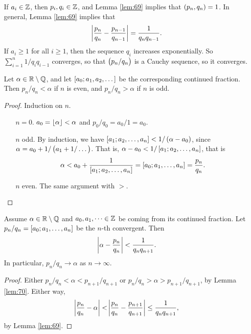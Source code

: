 \begin{note*}
If $ a_i \in \mathbb{Z} $, then $ p_i, q_i \in \mathbb{Z} $, and Lemma \ref{lem:69} implies that $ \br{p_n, q_n} = 1 $. In general, Lemma \ref{lem:69} implies that
$$ \abs{\dfrac{p_n}{q_n} - \dfrac{p_{n - 1}}{q_{n - 1}}} = \dfrac{1}{q_nq_{n - 1}}. $$
If $ a_i \ge 1 $ for all $ i \ge 1 $, then the sequence $ q_i $ increases exponentially. So $ \sum_{i = 1}^n 1 / q_iq_{i - 1} $ converges, so that $ \br{p_n / q_n} $ is a Cauchy sequence, so it converges.
\end{note*}

\pagebreak


\begin{lemma}
\label{lem:70}
Let $ \alpha \in \mathbb{R} \setminus \mathbb{Q} $, and let $ \sbr{a_0; a_1, a_2, \dots} $ be the corresponding continued fraction. Then $ p_n / q_n < \alpha $ if $ n $ is even, and $ p_n / q_n > \alpha $ if $ n $ is odd.
\end{lemma}

\begin{proof}
Induction on $ n $.
\begin{itemize}[leftmargin=0.5in]
\item[$ n = 0 $.] $ a_0 = \left\lfloor \alpha \right\rfloor < \alpha $ and $ p_0 / q_0 = a_0 / 1 = a_0 $.
\item[$ n $ odd.] By induction, we have $ \sbr{a_1; a_2, \dots, a_n} < 1 / \br{\alpha - a_0} $, since $ \alpha = a_0 + 1 / \br{a_1 + 1 / \dots} $. That is, $ \alpha - a_0 < 1 / \sbr{a_1; a_2, \dots, a_n} $, that is
$$ \alpha < a_0 + \dfrac{1}{\sbr{a_1; a_2, \dots, a_n}} = \sbr{a_0; a_1, \dots, a_n} = \dfrac{p_n}{q_n}. $$
\item[$ n $ even.] The same argument with $ > $.
\end{itemize}
\end{proof}

\begin{corollary}
Assume $ \alpha \in \mathbb{R} \setminus \mathbb{Q} $ and $ a_0, a_1, \dots \in \mathbb{Z} $ be coming from its continued fraction. Let $ p_n / q_n = \sbr{a_0; a_1, \dots, a_n} $ be the $ n $-th convergent. Then
$$ \abs{\alpha - \dfrac{p_n}{q_n}} < \dfrac{1}{q_nq_{n + 1}}. $$
In particular, $ p_n / q_n \to \alpha $ as $ n \to \infty $.
\end{corollary}

\begin{proof}
Either $ p_n / q_n < \alpha < p_{n + 1} / q_{n + 1} $ or $ p_n / q_n > \alpha > p_{n + 1} / q_{n + 1} $, by Lemma \ref{lem:70}. Either way,
$$ \abs{\dfrac{p_n}{q_n} - \alpha} < \abs{\dfrac{p_n}{q_n} - \dfrac{p_{n + 1}}{q_{n + 1}}} \le \dfrac{1}{q_nq_{n + 1}}, $$
by Lemma \ref{lem:69}.
\end{proof}

